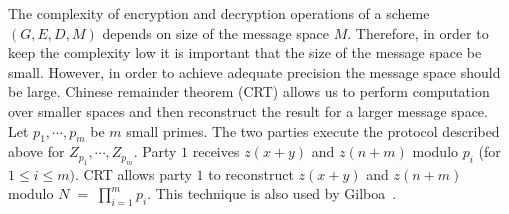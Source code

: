 The complexity of encryption and decryption operations of a scheme
$(G,E,D,M)$ depends on size of the message space $M$. Therefore, in
order to keep the complexity low it is important that the size of the
message space be small. However, in order to achieve adequate
precision the message space should be large. Chinese remainder theorem
(CRT) allows us to perform computation over smaller spaces and then
reconstruct the result for a larger message space. Let
$p_1,\cdots,p_m$ be $m$ small primes.  The two parties execute the
protocol described above for $Z_{p_1}, \cdots, Z_{p_m}$. Party $1$
receives $z (x+y)$ and $z (n+m)$ modulo $p_i$ (for $1 \leq i \leq
m)$. CRT allows party $1$ to reconstruct $z (x+y)$ and $z (n+m)$
modulo $N \; = \; \prod_{i=1}^m p_i$. This technique is also used by
Gilboa~\cite{Gilboa99}.











